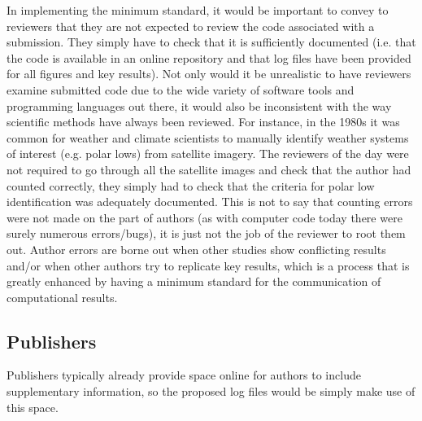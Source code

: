 In implementing the minimum standard, it would be important to convey to reviewers that they are not expected to review the code associated with a submission. They simply have to check that it is sufficiently documented (i.e. that the code is available in an online repository and that log files have been provided for all figures and key results). Not only would it be unrealistic to have reviewers examine submitted code due to the wide variety of software tools and programming languages out there, it would also be inconsistent with the way scientific methods have always been reviewed. For instance, in the 1980s it was common for weather and climate scientists to manually identify weather systems of interest (e.g. polar lows) from satellite imagery. The reviewers of the day were not required to go through all the satellite images and check that the author had counted correctly, they simply had to check that the criteria for polar low identification was adequately documented. This is not to say that counting errors were not made on the part of authors (as with computer code today there were surely numerous errors/bugs), it is just not the job of the reviewer to root them out. Author errors are borne out when other studies show conflicting results and/or when other authors try to replicate key results, which is a process that is greatly enhanced by having a minimum standard for the communication of computational results.

\subsection{Publishers}

Publishers typically already provide space online for authors to include supplementary information, so the proposed log files would be simply make use of this space. 